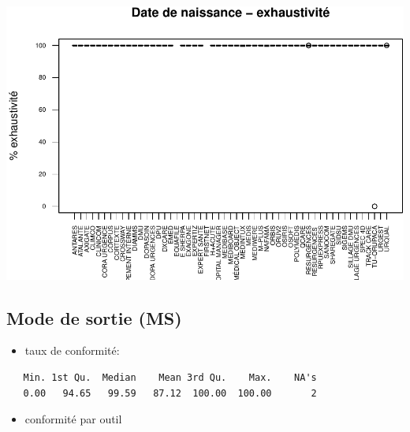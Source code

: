 \documentclass[]{article}
\providecommand{\tightlist}{%
  \setlength{\itemsep}{0pt}\setlength{\parskip}{0pt}}
\begin{document}
\includegraphics{septembre2015_files/figure-latex/unnamed-chunk-19-1.pdf}

\subsection{Mode de sortie (MS)}\label{mode-de-sortie-ms}

\begin{itemize}
\tightlist
\item
  taux de conformité:
\end{itemize}

\begin{verbatim}
   Min. 1st Qu.  Median    Mean 3rd Qu.    Max.    NA's 
   0.00   94.65   99.59   87.12  100.00  100.00       2 
\end{verbatim}

\begin{itemize}
\tightlist
\item
  conformité par outil
\end{itemize}
\end{document}
